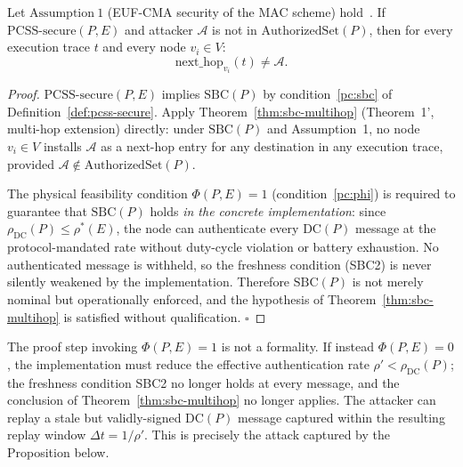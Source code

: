 \begin{theorem}
\label{thm:pcss-sufficiency}
Let $\mathrm{Assumption~1}$ (EUF-CMA security of the MAC scheme)
hold~\cite{goldwasser1988digital}.
If $\mathrm{PCSS\text{-}secure}(P, E)$ and attacker $\mathcal{A}$ is not
in $\mathrm{AuthorizedSet}(P)$, then for every execution trace $t$ and
every node $v_i \in V$:
\[
  \mathrm{next\_hop}_{v_i}(t) \neq \mathcal{A}.
\]
\end{theorem}

\begin{proof}
$\mathrm{PCSS\text{-}secure}(P, E)$ implies $\mathrm{SBC}(P)$ by
condition~\ref{pc:sbc} of Definition~\ref{def:pcss-secure}.  Apply
Theorem~\ref{thm:sbc-multihop} (Theorem~1', multi-hop extension)
directly: under $\mathrm{SBC}(P)$ and Assumption~1, no node $v_i \in V$
installs $\mathcal{A}$ as a next-hop entry for any destination in any
execution trace, provided $\mathcal{A} \notin \mathrm{AuthorizedSet}(P)$.

The physical feasibility condition $\Phi(P, E) = 1$
(condition~\ref{pc:phi}) is required to guarantee that $\mathrm{SBC}(P)$
holds \emph{in the concrete implementation}: since
$\rho_{\mathrm{DC}}(P) \le \rho^*(E)$, the node can authenticate every
$\mathrm{DC}(P)$ message at the protocol-mandated rate without
duty-cycle violation or battery exhaustion.  No authenticated message is
withheld, so the freshness condition (SBC2) is never silently weakened by
the implementation.  Therefore $\mathrm{SBC}(P)$ is not merely nominal
but operationally enforced, and the hypothesis of Theorem~\ref{thm:sbc-multihop}
is satisfied without qualification.
\hfill$\square$
\end{proof}

\begin{remark}
\label{rem:phi-in-proof}
The proof step invoking $\Phi(P,E)=1$ is not a formality.  If instead
$\Phi(P,E) = 0$, the implementation must reduce the effective
authentication rate $\rho' < \rho_{\mathrm{DC}}(P)$; the freshness
condition SBC2 no longer holds at every message, and the conclusion of
Theorem~\ref{thm:sbc-multihop} no longer applies.  The attacker can
replay a stale but validly-signed $\mathrm{DC}(P)$ message captured
within the resulting replay window $\Delta t = 1/\rho'$.  This is
precisely the attack captured by the Proposition below.
\end{remark}

